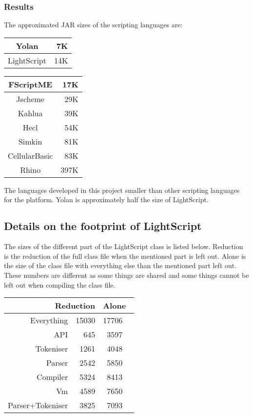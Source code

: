 \documentclass[11pt]{report}
\begin{document}
\subsubsection{Results}
The approximated JAR sizes of the scripting languages are:
\begin{center}
\begin{tabular}{|c|r|} \hline 
Yolan & 7K \\ \hline 
LightScript & 14K \\ \hline 
\end{tabular}
\begin{tabular}{|c|r|} \hline 
FScriptME & 17K \\ \hline 
Jscheme & 29K \\ \hline 
Kahlua & 39K \\ \hline 
Hecl & 54K \\ \hline 
Simkin & 81K \\ \hline 
CellularBasic & 83K \\ \hline 
Rhino & 397K \\ \hline 
\end{tabular}
\end{center}

The languages developed in this project smaller than other scripting languages for the platform. 
Yolan is approximately half the size of LightScript. 

\subsection{Details on the footprint of LightScript}
The sizes of the different part of the LightScript class is listed below.
Reduction is the reduction of the full class file when the mentioned part is left out. Alone is the size of the class file with everything else than the mentioned part left out. These numbers are different as some things are shared and some things cannot be left out when compiling the class file.

\begin{center} \begin{tabular}{|r|r|rl|} \hline
\multicolumn{2}{|r|}{Reduction} & \multicolumn{2}{|l|}{Alone}\\ \hline
Everything & 15030 & 17706 & \\ \hline
API & 645  & 3597  & \\ \hline
Tokeniser & 1261 & 4048 & \\ \hline
Parser & 2542 & 5850 & \\ \hline
Compiler & 5324 & 8413 & \\ \hline
Vm & 4589 & 7650 & \\ \hline
Parser+Tokeniser & 3825 & 7093 & \\ \hline
\end{tabular} \end{center}
\end{document}
